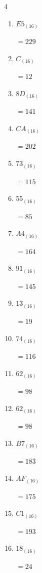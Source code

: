 \begin{multicols}{4}
\begin{enumerate}
        $=145$

  \item $E5_{(16)}$

        $=229$

  \item $C_{(16)}$

        $=12$

  \item $8D_{(16)}$

        $=141$

  \item $CA_{(16)}$

        $=202$

  \item $73_{(16)}$

        $=115$

  \item $55_{(16)}$

        $=85$

  \item $A4_{(16)}$

        $=164$

  \item $91_{(16)}$

        $=145$

  \item $13_{(16)}$

        $=19$

  \item $74_{(16)}$

        $=116$

  \item $62_{(16)}$

        $=98$

  \item $62_{(16)}$

        $=98$

  \item $B7_{(16)}$

        $=183$

\columnbreak %

  \item $AF_{(16)}$

        $=175$

  \item $C1_{(16)}$

        $=193$

  \item $18_{(16)}$

        $=24$


\end{enumerate}
\end{multicols}
